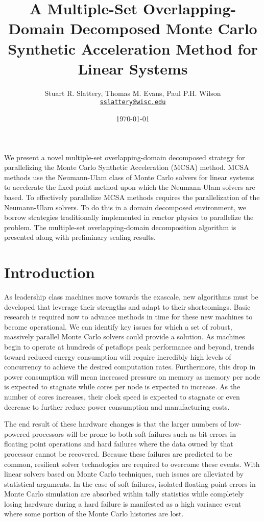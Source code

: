 \documentclass[letterpaper,12pt]{article}
\author{Stuart R. Slattery, Thomas M. Evans, Paul P.H. Wilson
\\ \href{mailto:sslattery@wisc.edu}{\texttt{sslattery@wisc.edu}}
}
\date{\today}
\title{A Multiple-Set Overlapping-Domain Decomposed Monte Carlo
  Synthetic Acceleration Method for Linear Systems}
\begin{document}
\maketitle

\abstract
{
We present a novel multiple-set overlapping-domain decomposed strategy
for parallelizing the Monte Carlo Synthetic Acceleration (MCSA)
method. MCSA methods use the Neumann-Ulam class of Monte Carlo solvers
for linear systems to accelerate the fixed point method upon which
the Neumann-Ulam solvers are based. To effectively parallelize MCSA
methods requires the parallelization of the Neumann-Ulam solvers. To
do this in a domain decomposed environment, we borrow strategies
traditionally implemented in reactor physics to parallelize the
problem. The multiple-set overlapping-domain decomposition algorithm
is presented along with preliminary scaling results.
}

\section{Introduction}
As leadership class machines move towards the exascale, new algorithms
must be developed that leverage their strengths and adapt to their
shortcomings. Basic research is required now to advance methods in
time for these new machines to become operational. We can identify key
issues for which a set of robust, massively parallel Monte Carlo
solvers could provide a solution. As machines begin to operate at
hundreds of petaflops peak performance and beyond, trends toward
reduced energy consumption will require incredibly high levels of
concurrency to achieve the desired computation rates. Furthermore,
this drop in power consumption will mean increased pressure on memory
as memory per node is expected to stagnate while cores per node is
expected to increase. As the number of cores increases, their clock
speed is expected to stagnate or even decrease to further reduce power
consumption and manufacturing costs. 

The end result of these hardware changes is that the larger numbers of
low-powered processors will be prone to both soft failures such as bit
errors in floating point operations and hard failures where the data
owned by that processor cannot be recovered. Because these failures
are predicted to be common, resilient solver technologies are required
to overcome these events. With linear solvers based on Monte Carlo
techniques, such issues are alleviated by statistical arguments. In
the case of soft failures, isolated floating point errors in Monte
Carlo simulation are absorbed within tally statistics while completely
losing hardware during a hard failure is manifested as a high variance
event where some portion of the Monte Carlo histories are lost.
\end{document}
